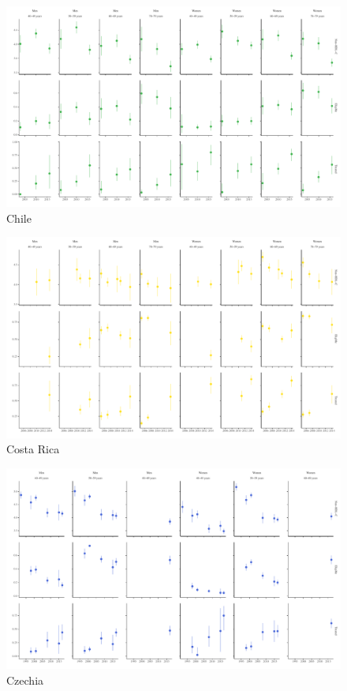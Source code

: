 \documentclass[12pt]{article}
\begin{document}
\begin{appendix}
\begin{landscape}
        \begin{figure}[H]
            \centering
            \includegraphics[width=\linewidth]{../3_figures/countries/fig_chile.pdf}
            \caption{Chile}
            \label{fig:chile}
        \end{figure}
    
        \begin{figure}[H]
            \centering
            \includegraphics[width=\linewidth]{../3_figures/countries/fig_costa rica.pdf}
            \caption{Costa Rica}
            \label{fig:costa_rica}
        \end{figure}
    
        \begin{figure}[H]
            \centering
            \includegraphics[width=\linewidth]{../3_figures/countries/fig_czechia.pdf}
            \caption{Czechia}
            \label{fig:czechia}
        \end{figure}


\end{landscape}
\end{appendix}
\end{document}
